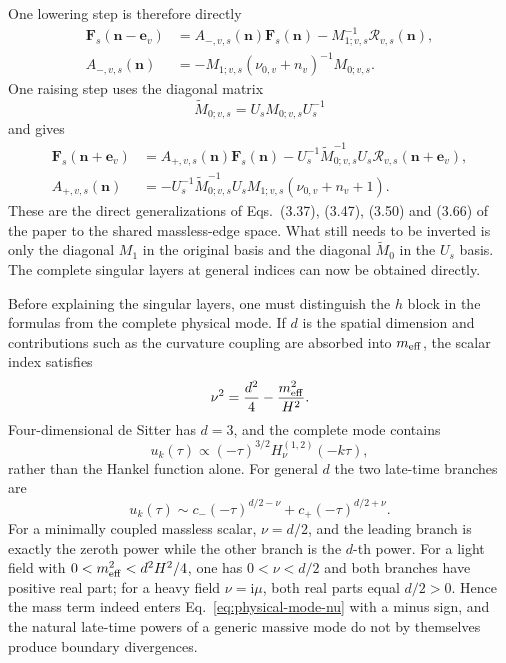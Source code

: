 \documentclass[11pt,a4paper]{article}
\newcommand{\ii}{\mathrm i}
\newcommand{\cR}{\mathcal R}
\begin{document}
One lowering step is therefore directly
\begin{align}
 \bm F_s(\bm n-\bm e_v)
 &=A_{-,v,s}(\bm n)\bm F_s(\bm n)
 -M_{1;v,s}^{-1}\cR_{v,s}(\bm n),\\
 A_{-,v,s}(\bm n)
 &=-M_{1;v,s}(\nu_{0,v}+n_v)^{-1}M_{0;v,s}.
 \label{eq:global-Aminus}
\end{align}
One raising step uses the diagonal matrix
\begin{equation}
 \widetilde M_{0;v,s}=U_sM_{0;v,s}U_s^{-1}
\end{equation}
and gives
\begin{align}
 \bm F_s(\bm n+\bm e_v)
 &=A_{+,v,s}(\bm n)\bm F_s(\bm n)
 -U_s^{-1}\widetilde M_{0;v,s}^{-1}U_s
 \cR_{v,s}(\bm n+\bm e_v),\\
 A_{+,v,s}(\bm n)
 &=-U_s^{-1}\widetilde M_{0;v,s}^{-1}U_s
 M_{1;v,s}(\nu_{0,v}+n_v+1).
 \label{eq:global-Aplus}
\end{align}
These are the direct generalizations of Eqs.~(3.37), (3.47), (3.50) and (3.66) of the paper to the shared massless-edge space. What still needs to be inverted is only the diagonal $M_1$ in the original basis and the diagonal $\widetilde M_0$ in the $U_s$ basis. The complete singular layers at general indices can now be obtained directly.

Before explaining the singular layers, one must distinguish the $h$ block in the formulas from the complete physical mode. If $d$ is the spatial dimension and contributions such as the curvature coupling are absorbed into $m_{\rm eff}$, the scalar index satisfies
\begin{equation}
 \nu^2=\frac{d^2}{4}-\frac{m_{\rm eff}^2}{H^2}.
 \label{eq:physical-mode-nu}
\end{equation}
Four-dimensional de Sitter has $d=3$, and the complete mode contains
\begin{equation}
 u_k(\tau)\propto(-\tau)^{3/2}H_\nu^{(1,2)}(-k\tau),
 \label{eq:physical-mode-full-power}
\end{equation}
rather than the Hankel function alone. For general $d$ the two late-time branches are
\begin{equation}
 u_k(\tau)\sim c_-(-\tau)^{d/2-\nu}
 +c_+(-\tau)^{d/2+\nu}.
 \label{eq:physical-late-time-branches}
\end{equation}
For a minimally coupled massless scalar, $\nu=d/2$, and the leading branch is exactly the zeroth power while the other branch is the $d$-th power. For a light field with $0<m_{\rm eff}^2<d^2H^2/4$, one has $0<\nu<d/2$ and both branches have positive real part; for a heavy field $\nu=\ii\mu$, both real parts equal $d/2>0$. Hence the mass term indeed enters Eq.~\eqref{eq:physical-mode-nu} with a minus sign, and the natural late-time powers of a generic massive mode do not by themselves produce boundary divergences.
\end{document}
